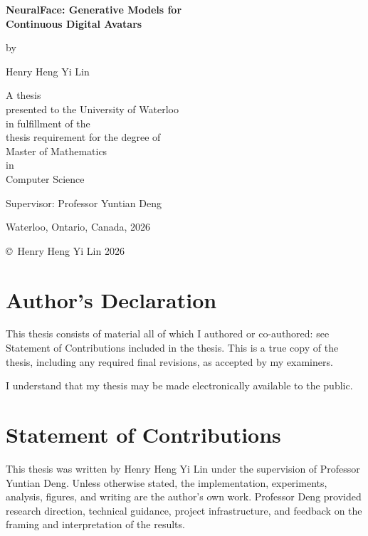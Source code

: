 \documentclass[12pt,letterpaper]{report}
\begin{document}

\begin{titlepage}
    \centering
    \vspace*{1in}
    {\Large \bfseries NeuralFace: Generative Models for \\ Continuous Digital Avatars \par}
    \vspace{1.5in}
    by\par
    \vspace{0.5in}
    Henry Heng Yi Lin\par
    \vspace{1.5in}
    A thesis\\
    presented to the University of Waterloo\\
    in fulfillment of the\\
    thesis requirement for the degree of\\
    Master of Mathematics\\
    in\\
    Computer Science\par
    \vspace{0.5in}
    Supervisor: Professor Yuntian Deng\par
    \vspace{0.5in}
    Waterloo, Ontario, Canada, 2026\par
    \vspace{0.5in}
    \copyright\ Henry Heng Yi Lin 2026
\end{titlepage}

\setcounter{page}{2}

\chapter*{Author's Declaration}
This thesis consists of material all of which I authored or co-authored: see Statement of Contributions included in the thesis. This is a true copy of the thesis, including any required final revisions, as accepted by my examiners. 

I understand that my thesis may be made electronically available to the public.

\chapter*{Statement of Contributions}
This thesis was written by Henry Heng Yi Lin under the supervision of Professor Yuntian Deng. Unless otherwise stated, the implementation, experiments, analysis, figures, and writing are the author's own work. Professor Deng provided research direction, technical guidance, project infrastructure, and feedback on the framing and interpretation of the results.
\end{document}
